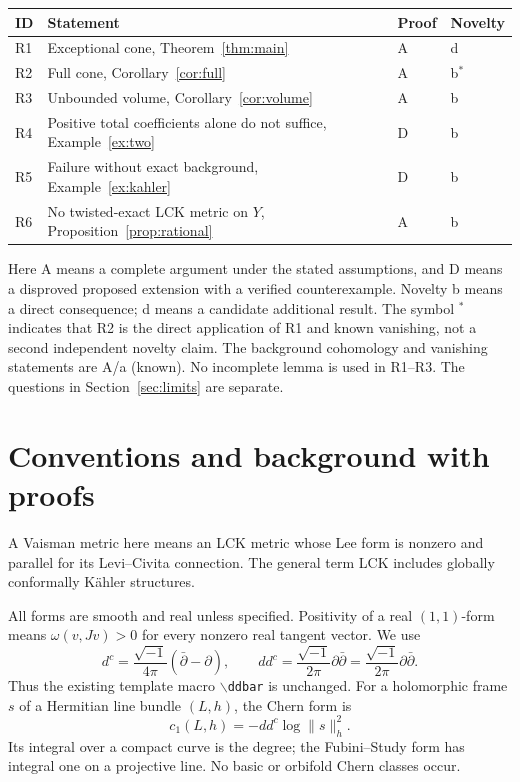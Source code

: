 \documentclass[12pt]{amsart}
\theoremstyle{definition}
\theoremstyle{remark}
\numberwithin{equation}{section}
\newcommand{\ddbar}{\frac{\sqrt{-1}}{2\pi} \partial \bar{\partial}}
\begin{document}
\begin{center}\small
\begin{tabular}{@{}p{1cm}p{8.4cm}p{1cm}p{1.5cm}@{}}
\toprule
ID & Statement & Proof & Novelty\\\midrule
R1 & Exceptional cone, Theorem~\ref{thm:main} & A & d\\
R2 & Full cone, Corollary~\ref{cor:full} & A & b$^*$\\
R3 & Unbounded volume, Corollary~\ref{cor:volume} & A & b\\
R4 & Positive total coefficients alone do not suffice, Example~\ref{ex:two} & D & b\\
R5 & Failure without exact background, Example~\ref{ex:kahler} & D & b\\
R6 & No twisted-exact LCK metric on $Y$, Proposition~\ref{prop:rational} & A & b\\
\bottomrule
\end{tabular}
\end{center}
Here A means a complete argument under the stated assumptions, and D means a disproved proposed extension with a verified counterexample. Novelty b means a direct consequence; d means a candidate additional result. The symbol $^*$ indicates that R2 is the direct application of R1 and known vanishing, not a second independent novelty claim. The background cohomology and vanishing statements are A/a (known). No incomplete lemma is used in R1--R3. The questions in Section~\ref{sec:limits} are separate.

\section{Conventions and background with proofs}\label{sec:prelim}
A Vaisman metric here means an LCK metric whose Lee form is nonzero and parallel for its Levi--Civita connection. The general term LCK includes globally conformally K\"ahler structures.

All forms are smooth and real unless specified. Positivity of a real $(1,1)$-form means $\omega(v,Jv)>0$ for every nonzero real tangent vector. We use
\begin{equation}\label{eq:dc}
 d^c=\frac{\sqrt{-1}}{4\pi}(\bar\partial-\partial),\qquad
 dd^c=\frac{\sqrt{-1}}{2\pi}\partial\bar\partial=\ddbar.
\end{equation}
Thus the existing template macro $\backslash$\texttt{ddbar} is unchanged. For a holomorphic frame $s$ of a Hermitian line bundle $(L,h)$, the Chern form is
\begin{equation}\label{eq:chern}
 c_1(L,h)=-dd^c\log\|s\|_h^2.
\end{equation}
Its integral over a compact curve is the degree; the Fubini--Study form has integral one on a projective line. No basic or orbifold Chern classes occur.
\end{document}
